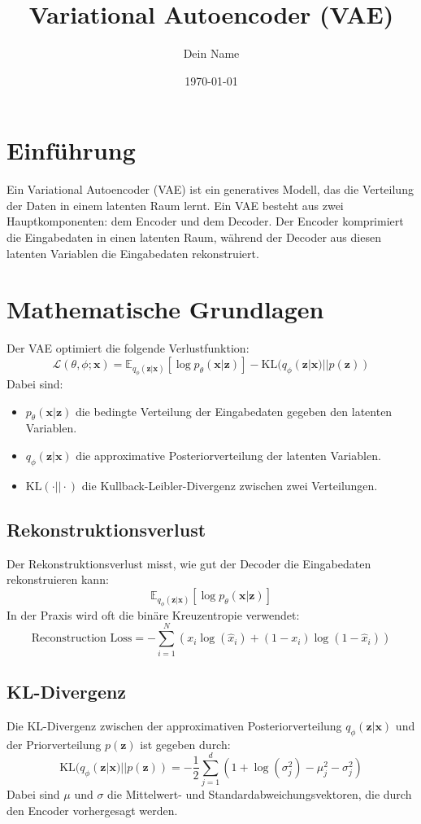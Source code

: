 \documentclass{article}
\title{Variational Autoencoder (VAE)}
\author{Dein Name}
\date{\today}
\begin{document}
	\maketitle
	
	\section{Einführung}
	Ein Variational Autoencoder (VAE) ist ein generatives Modell, das die Verteilung der Daten in einem latenten Raum lernt. Ein VAE besteht aus zwei Hauptkomponenten: dem Encoder und dem Decoder. Der Encoder komprimiert die Eingabedaten in einen latenten Raum, während der Decoder aus diesen latenten Variablen die Eingabedaten rekonstruiert.
	
	\section{Mathematische Grundlagen}
	Der VAE optimiert die folgende Verlustfunktion:
	\[
	\mathcal{L}(\theta, \phi; \mathbf{x}) = \mathbb{E}_{q_{\phi}(\mathbf{z}|\mathbf{x})} \left[ \log p_{\theta}(\mathbf{x}|\mathbf{z}) \right] - \text{KL}(q_{\phi}(\mathbf{z}|\mathbf{x}) || p(\mathbf{z}))
	\]
	Dabei sind:
	\begin{itemize}
		\item \( p_{\theta}(\mathbf{x}|\mathbf{z}) \) die bedingte Verteilung der Eingabedaten gegeben den latenten Variablen.
		\item \( q_{\phi}(\mathbf{z}|\mathbf{x}) \) die approximative Posteriorverteilung der latenten Variablen.
		\item \(\text{KL}(\cdot || \cdot)\) die Kullback-Leibler-Divergenz zwischen zwei Verteilungen.
	\end{itemize}
	
	\subsection{Rekonstruktionsverlust}
	Der Rekonstruktionsverlust misst, wie gut der Decoder die Eingabedaten rekonstruieren kann:
	\[
	\mathbb{E}_{q_{\phi}(\mathbf{z}|\mathbf{x})} \left[ \log p_{\theta}(\mathbf{x}|\mathbf{z}) \right]
	\]
	In der Praxis wird oft die binäre Kreuzentropie verwendet:
	\[
	\text{Reconstruction Loss} = -\sum_{i=1}^N \left( x_i \log(\hat{x}_i) + (1 - x_i) \log(1 - \hat{x}_i) \right)
	\]
	
	\subsection{KL-Divergenz}
	Die KL-Divergenz zwischen der approximativen Posteriorverteilung \( q_{\phi}(\mathbf{z}|\mathbf{x}) \) und der Priorverteilung \( p(\mathbf{z}) \) ist gegeben durch:
	\[
	\text{KL}(q_{\phi}(\mathbf{z}|\mathbf{x}) || p(\mathbf{z})) = -\frac{1}{2} \sum_{j=1}^d \left( 1 + \log(\sigma_j^2) - \mu_j^2 - \sigma_j^2 \right)
	\]
	Dabei sind \( \mu \) und \( \sigma \) die Mittelwert- und Standardabweichungsvektoren, die durch den Encoder vorhergesagt werden.
	
\end{document}
